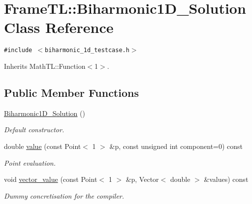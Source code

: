 \hypertarget{classFrameTL_1_1Biharmonic1D__Solution}{
\section{FrameTL::Biharmonic1D\_\-Solution Class Reference}
\label{classFrameTL_1_1Biharmonic1D__Solution}
}
{\tt \#include $<$biharmonic\_\-1d\_\-testcase.h$>$}

Inherits MathTL::Function$<$1$>$.

\subsection*{Public Member Functions}
\begin{CompactItemize}
\item 
\hypertarget{classFrameTL_1_1Biharmonic1D__Solution_0ac47ada14854cf3055e551c24c15d23}{
\hyperlink{classFrameTL_1_1Biharmonic1D__Solution_0ac47ada14854cf3055e551c24c15d23}{Biharmonic1D\_\-Solution} ()}
\label{classFrameTL_1_1Biharmonic1D__Solution_0ac47ada14854cf3055e551c24c15d23}

\begin{CompactList}\small\item\em Default constructor. \item\end{CompactList}\item 
\hypertarget{classFrameTL_1_1Biharmonic1D__Solution_24f451d77510c4e288e0bdf7fb7b5034}{
double \hyperlink{classFrameTL_1_1Biharmonic1D__Solution_24f451d77510c4e288e0bdf7fb7b5034}{value} (const Point$<$ 1 $>$ \&p, const unsigned int component=0) const }
\label{classFrameTL_1_1Biharmonic1D__Solution_24f451d77510c4e288e0bdf7fb7b5034}

\begin{CompactList}\small\item\em Point evaluation. \item\end{CompactList}\item 
\hypertarget{classFrameTL_1_1Biharmonic1D__Solution_06eca619ffab0ade6671bcdd9bdd15ae}{
void \hyperlink{classFrameTL_1_1Biharmonic1D__Solution_06eca619ffab0ade6671bcdd9bdd15ae}{vector\_\-value} (const Point$<$ 1 $>$ \&p, Vector$<$ double $>$ \&values) const }
\label{classFrameTL_1_1Biharmonic1D__Solution_06eca619ffab0ade6671bcdd9bdd15ae}

\begin{CompactList}\small\item\em Dummy concretisation for the compiler. \item\end{CompactList}\end{CompactItemize}


